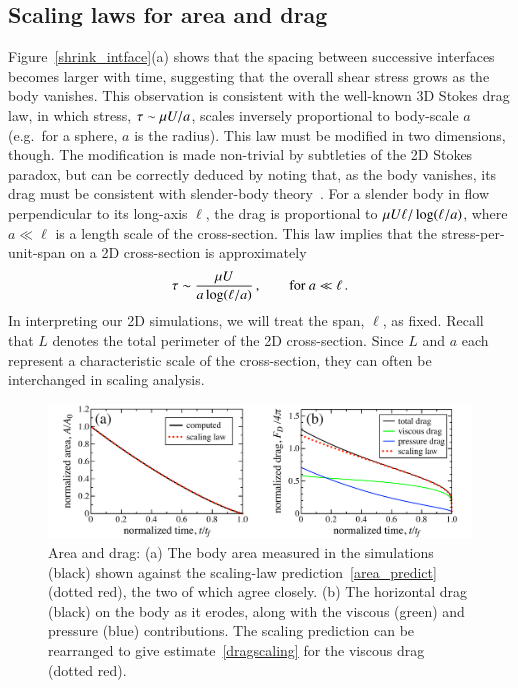 \documentclass[preprint, 10pt]{elsarticle}
\begin{document}
\subsection{Scaling laws for area and drag}
\label{sec:scaling}

Figure~\ref{shrink_intface}(a) shows that the spacing between successive interfaces becomes larger with time, suggesting that the overall shear stress grows as the body vanishes. This observation is consistent with the well-known 3D Stokes drag law, in which stress, $\tau \sim \mu U / a$, scales inversely proportional to body-scale $a$ (e.g.~for a sphere, $a$ is the radius). This law must be modified in two dimensions, though. The modification is made non-trivial by subtleties of the 2D Stokes paradox, but can be correctly deduced by noting that, as the body vanishes, its drag must be consistent with slender-body theory~\cite{batchelor1970slender, MooreJFM2012}.  For a slender body in flow perpendicular to its long-axis $\ell$, the drag is proportional to $\mu U \ell/ \log(\ell/a)$, where $a \ll \ell $ is a length scale of the cross-section. This law implies that the stress-per-unit-span on a 2D cross-section is approximately
\begin{align}
  \label{eqn:stresslaw}
  \tau \sim \frac{\mu U}{a \log(\ell/a)}\, , \qquad \text{for } a \ll \ell \, .
\end{align}
In interpreting our 2D simulations, we will treat the span, $\ell$, as fixed. Recall that $L$ denotes the total perimeter of the 2D cross-section. Since $L$ and $a$ each represent a characteristic scale of the cross-section, they can often be interchanged in scaling analysis.  

\begin{figure}%
\begin{center}
\includegraphics[width = 0.9 \textwidth]{./figs/area_drag.pdf}
\caption{Area and drag: (a) The body area measured in the simulations (black) shown against the scaling-law prediction~\eqref{area_predict} (dotted red), the two of which agree closely. (b) The horizontal drag (black) on the body as it erodes, along with the viscous (green) and pressure (blue) contributions. The scaling prediction can be rearranged to give estimate~\eqref{dragscaling} for the viscous drag (dotted red).}
\label{area_drag}
\end{center}
\end{figure}
\end{document}

